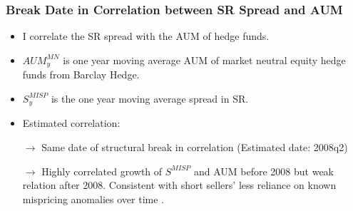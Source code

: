 \documentclass{beamer}
\begin{document}
\begin{frame}[label=aum_spread_correlate]
\frametitle{Break Date in Correlation between SR Spread and AUM}
\vspace*{-0.2cm}

\begin{itemize}
\item I correlate the SR spread with the AUM of hedge funds.
\item $AUM^{MN}_y$ is one year moving average AUM of market neutral equity hedge funds from Barclay Hedge.
\item $S^{MISP}_y$ is the one year moving average spread in SR.
\item Estimated correlation:
\end{itemize}

\vspace*{-0.2cm}
\begin{table}[htbp]
  \centering
  \footnotesize
  	  \resizebox{0.6\textwidth}{!}{	 	
	 	
	\label{tab:aum_spread_correlate}%
	}
\end{table}
\begin{itemize}
\item[$\rightarrow$] Same date of structural break in correlation (Estimated date: 2008q2) %
\item[$\rightarrow$] Highly correlated growth of $S^{MISP}$ and AUM before 2008 but weak relation after 2008. Consistent with short sellers' less reliance on known mispricing anomalies over time \citep{Wu2014}. \hfill \hyperlink{break_anomalies}{} 
\end{itemize}
	\end{frame}
	
\end{document}
